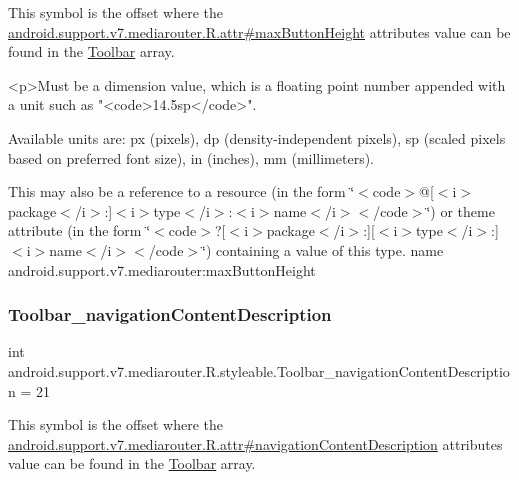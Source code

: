 This symbol is the offset where the \hyperlink{classandroid_1_1support_1_1v7_1_1mediarouter_1_1R_1_1attr_afa356a4dee8535ed3f96158d489bb1c3}{android.\+support.\+v7.\+mediarouter.\+R.\+attr\#max\+Button\+Height} attribute\textquotesingle{}s value can be found in the \hyperlink{classandroid_1_1support_1_1v7_1_1mediarouter_1_1R_1_1styleable_a6815cdfaadde30c82b955863af196899}{Toolbar} array.

\begin{DoxyVerb}      <p>Must be a dimension value, which is a floating point number appended with a unit such as "<code>14.5sp</code>".
\end{DoxyVerb}
 Available units are\+: px (pixels), dp (density-\/independent pixels), sp (scaled pixels based on preferred font size), in (inches), mm (millimeters). 

This may also be a reference to a resource (in the form \char`\"{}$<$code$>$@\mbox{[}$<$i$>$package$<$/i$>$\+:\mbox{]}$<$i$>$type$<$/i$>$\+:$<$i$>$name$<$/i$>$$<$/code$>$\char`\"{}) or theme attribute (in the form \char`\"{}$<$code$>$?\mbox{[}$<$i$>$package$<$/i$>$\+:\mbox{]}\mbox{[}$<$i$>$type$<$/i$>$\+:\mbox{]}$<$i$>$name$<$/i$>$$<$/code$>$\char`\"{}) containing a value of this type.  name android.\+support.\+v7.\+mediarouter\+:max\+Button\+Height \mbox{\label{classandroid_1_1support_1_1v7_1_1mediarouter_1_1R_1_1styleable_afe01241b2d5b5f87f898aa12e71cfa1c}} 
\subsubsection{\texorpdfstring{Toolbar\+\_\+navigation\+Content\+Description}{Toolbar\_navigationContentDescription}}
{\footnotesize\ttfamily int android.\+support.\+v7.\+mediarouter.\+R.\+styleable.\+Toolbar\+\_\+navigation\+Content\+Description = 21\hspace{0.3cm}{\ttfamily [static]}}

This symbol is the offset where the \hyperlink{classandroid_1_1support_1_1v7_1_1mediarouter_1_1R_1_1attr_aab82fbda26602ce100437b76fb07a3a1}{android.\+support.\+v7.\+mediarouter.\+R.\+attr\#navigation\+Content\+Description} attribute\textquotesingle{}s value can be found in the \hyperlink{classandroid_1_1support_1_1v7_1_1mediarouter_1_1R_1_1styleable_a6815cdfaadde30c82b955863af196899}{Toolbar} array.

